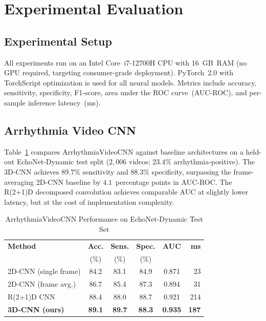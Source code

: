\documentclass[journal,10pt,twoside]{IEEEtran}
\begin{document}
\section{Experimental Evaluation}
\label{sec:experiments}

\subsection{Experimental Setup}

All experiments run on an Intel Core~i7-12700H CPU with 16~GB~RAM (no GPU required,
targeting consumer-grade deployment).
PyTorch~2.0 with TorchScript optimization is used for all neural models.
Metrics include accuracy, sensitivity, specificity, F1-score, area under the ROC
curve~(AUC-ROC), and per-sample inference latency~(ms).

\subsection{Arrhythmia Video CNN}

Table~\ref{tab:arrhythmia} compares ArrhythmiaVideoCNN against baseline architectures
on a held-out EchoNet-Dynamic test split ($2{,}006$ videos; $23.4\%$ arrhythmia-positive).
The 3D-CNN achieves $89.7\%$ sensitivity and $88.3\%$ specificity, surpassing the
frame-averaging 2D-CNN baseline by $4.1$~percentage points in AUC-ROC.
The R(2+1)D decomposed convolution achieves comparable AUC at slightly lower latency,
but at the cost of implementation complexity.

\begin{table}[!t]
  \caption{ArrhythmiaVideoCNN Performance on EchoNet-Dynamic Test Set}
  \label{tab:arrhythmia}
  \centering
  \renewcommand{\arraystretch}{1.2}
  \begin{tabular}{lccccr}
    \toprule
    \textbf{Method} & \textbf{Acc.} & \textbf{Sens.} & \textbf{Spec.} &
    \textbf{AUC} & \textbf{ms} \\
    & (\%) & (\%) & (\%) & & \\
    \midrule
    2D-CNN (single frame)   & 84.2 & 83.1 & 84.9 & 0.871 & 23 \\
    2D-CNN (frame avg.)     & 86.7 & 85.4 & 87.3 & 0.894 & 31 \\
    R(2+1)D CNN             & 88.4 & 88.0 & 88.7 & 0.921 & 214 \\
    \textbf{3D-CNN (ours)}  & \textbf{89.1} & \textbf{89.7} & \textbf{88.3}
                            & \textbf{0.935} & \textbf{187} \\
    \bottomrule
  \end{tabular}
\end{table}
\end{document}

